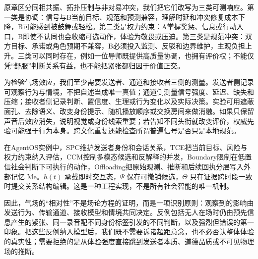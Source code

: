 原章区分同相共振、拓扑压制与非对易冲突，我们把它们改写为三类可测响应。第一类是协调：信号与B当前目标、规范和预测兼容，理解时延和冲突修复成本下降，B可能感到被鼓舞或轻松。第二类是权力约束：A掌握奖惩、信息或行动入口，B即使不认同也会收缩可选动作，体验为敬畏或压迫。第三类是规范冲突：双方目标、承诺或角色预期不兼容，B必须投入监测、反驳和边界维护，主观负担上升。三类可以同时存在，例如一位导师既提供高质量协调，也拥有评价权；不能仅凭“舒服”判断关系有益，也不能把紧张都归因于价值正交。

为检验气场效应，我们至少需要发送者、通道和接收者三侧的测量。发送者侧记录可观察行为与情境，不把自述当成唯一真值；通道侧测量信号强度、延迟、缺失和压缩；接收者侧记录判断、置信度、生理或行为变化以及实际决策。实验可用遮蔽面孔、去除语义、改变身份提示、随机播放顺序或交换房间来做消融。如果只保留声音后效应消失，说明视觉或身份线索重要；若告知不同头衔就改变评价，权威先验可能强于行为本身。跨文化重复还能检查所谓普遍信号是否只是本地规范。

在AgentOS实例中，SPC维护发送者身份和会话关系，TCE把当前目标、风险与权力约束纳入评估，CCM控制多模态候选和反解释的并发，Boundary限制在低置信社会判断下可执行的动作，Offloading把原始观测、推断和后续回执分层写入外部记忆 $\mathrm{Me}$。$h(t)$ 承载即时交互态，$\Psi$ 保存可撤销候选，$\Theta$ 只在证据跨时段一致时提交关系结构编辑。这是一种工程实现，不是所有社会智能的唯一机制。

因此，气场的“相对性”不是场论方程的证明，而是一项识别原则：观察到的影响由发送行为、传输通道、接收模型和情境共同决定。反例包括无人在场时仍由预先信息产生的紧张、同一录音配不同身份标签引发的不同判断，以及强烈但错误的第一印象。把这些反例纳入模型后，我们既不需要诉诸超距意念，也不必否认整体体验的真实性；需要拒绝的是从体验强度直接跳到发送者本质、道德品质或不可见物理场的推断。
